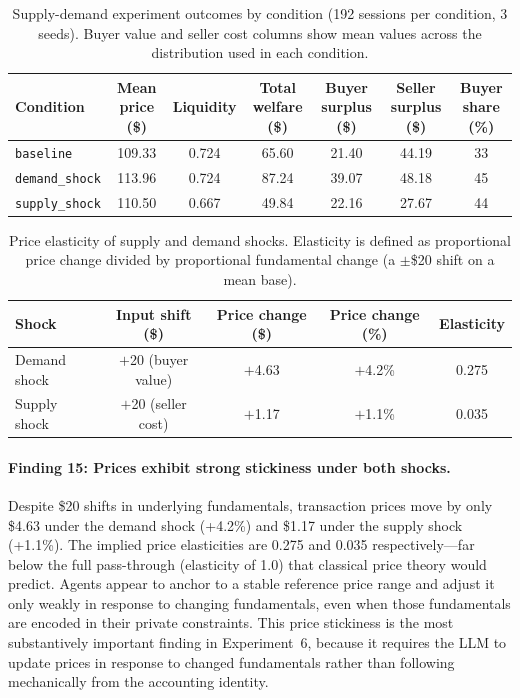 \begin{table}[ht]
\centering
\caption{Supply-demand experiment outcomes by condition (192 sessions per condition, 3 seeds).  Buyer value and seller cost columns show mean values across the distribution used in each condition.}
\label{tab:supply-demand}
\begin{tabular}{@{}lcccccc@{}}
\toprule
Condition & Mean price (\$) & Liquidity & Total welfare (\$) & Buyer surplus (\$) & Seller surplus (\$) & Buyer share (\%) \\
\midrule
\texttt{baseline}      & 109.33 & 0.724 & 65.60 & 21.40 & 44.19 & 33 \\
\texttt{demand\_shock} & 113.96 & 0.724 & 87.24 & 39.07 & 48.18 & 45 \\
\texttt{supply\_shock} & 110.50 & 0.667 & 49.84 & 22.16 & 27.67 & 44 \\
\bottomrule
\end{tabular}
\end{table}

\begin{table}[ht]
\centering
\caption{Price elasticity of supply and demand shocks.  Elasticity is defined as proportional price change divided by proportional fundamental change (a $\pm$\$20 shift on a mean base).}
\label{tab:elasticities}
\begin{tabular}{@{}lcccc@{}}
\toprule
Shock & Input shift (\$) & Price change (\$) & Price change (\%) & Elasticity \\
\midrule
Demand shock & $+$20 (buyer value) & $+$4.63 & $+$4.2\% & 0.275 \\
Supply shock & $+$20 (seller cost) & $+$1.17 & $+$1.1\% & 0.035 \\
\bottomrule
\end{tabular}
\end{table}

\paragraph{Finding 15: Prices exhibit strong stickiness under both shocks.}
Despite \$20 shifts in underlying fundamentals, transaction prices move by only \$4.63 under the demand shock (+4.2\%) and \$1.17 under the supply shock (+1.1\%).  The implied price elasticities are 0.275 and 0.035 respectively---far below the full pass-through (elasticity of 1.0) that classical price theory would predict.  Agents appear to anchor to a stable reference price range and adjust it only weakly in response to changing fundamentals, even when those fundamentals are encoded in their private constraints.  This price stickiness is the most substantively important finding in Experiment~6, because it requires the LLM to update prices in response to changed fundamentals rather than following mechanically from the accounting identity.

